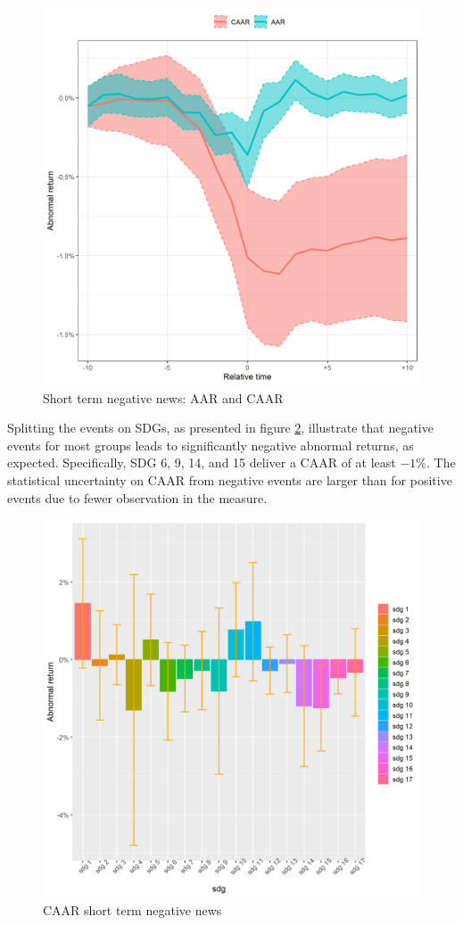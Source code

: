 \begin{figure} [H]
    \centering
    \includegraphics[scale=0.6]{Projekt/1.Figures analysis/ST_negative_all_CI.png}
    \caption{Short term negative news: AAR and CAAR}
    \label{fig:ST_neg_news}
\end{figure}

Splitting the events on SDGs, as presented in figure \ref{fig:ST_neg_bar}, illustrate that negative events for most groups leads to significantly negative abnormal returns, as expected. Specifically, SDG 6, 9, 14, and 15 deliver a CAAR of at least $-1\%$. The statistical uncertainty on CAAR from negative events are larger than for positive events due to fewer observation in the measure.   


\begin{figure} [H]
    \centering
    \includegraphics[scale=0.6]{Projekt/1.Figures analysis/ST_negative_sdg_bar.png}
    \caption{CAAR short term negative news}
    \label{fig:ST_neg_bar}
\end{figure}




